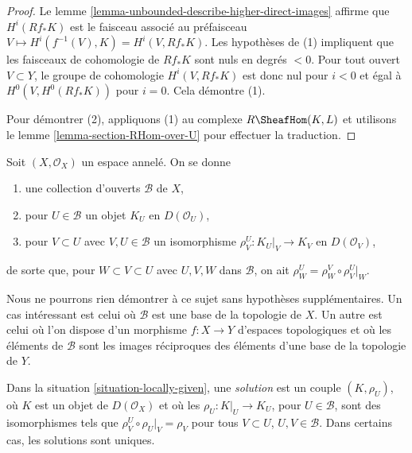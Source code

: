 {\begin{lemma}
\end{lemma}

\begin{proof}
Le lemme \ref{lemma-unbounded-describe-higher-direct-images} affirme que $H^i(Rf_*K)$ est le faisceau associé au préfaisceau $V \mapsto H^i(f^{-1}(V), K) = H^i(V, Rf_*K)$. Les hypothèses de (1) impliquent que les faisceaux de cohomologie de $Rf_*K$ sont nuls en degrés $< 0$. Pour tout ouvert $V \subset Y$, le groupe de cohomologie $H^i(V, Rf_*K)$ est donc nul pour $i < 0$ et égal à $H^0(V, H^0(Rf_*K))$ pour $i = 0$. Cela démontre (1).

\medskip\noindent

Pour démontrer (2), appliquons (1) au complexe $R\SheafHom(K, L)$ et utilisons le lemme \ref{lemma-section-RHom-over-U} pour effectuer la traduction.

\end{proof}

\begin{situation}

\label{situation-locally-given}

Soit $(X, \mathcal{O}_X)$ un espace annelé. On se donne

\begin{enumerate}

\item une collection d'ouverts $\mathcal{B}$ de $X$,
\item pour $U \in \mathcal{B}$ un objet $K_U$ en $D(\mathcal{O}_U)$,
\item pour $V \subset U$ avec $V, U \in \mathcal{B}$ un isomorphisme
$\rho^U_V : K_U|_V \to K_V$ en $D(\mathcal{O}_V)$,

\end{enumerate}

de sorte que, pour $W \subset V \subset U$ avec $U, V, W$ dans
$\mathcal{B}$, on ait $\rho^U_W = \rho^V_W \circ \rho ^U_V|_W$.

\end{situation}

\noindent
Nous ne pourrons rien démontrer à ce sujet sans hypothèses supplémentaires. Un cas intéressant est celui où $\mathcal{B}$ est une base de la topologie de $X$. Un autre est celui où l'on dispose d'un morphisme $f : X \to Y$ d'espaces topologiques et où les éléments de $\mathcal{B}$ sont les images réciproques des éléments d'une base de la topologie de $Y$.

\medskip\noindent
Dans la situation \ref{situation-locally-given}, une {\it solution} est un couple $(K, \rho_U)$, où $K$ est un objet de $D(\mathcal{O}_X)$ et où les $\rho_U : K|_U \to K_U$, pour $U \in \mathcal{B}$, sont des isomorphismes tels que $\rho^U_V \circ \rho_U|_V = \rho_V$ pour tous $V \subset U$, $U, V \in \mathcal{B}$. Dans certains cas, les solutions sont uniques.

}

